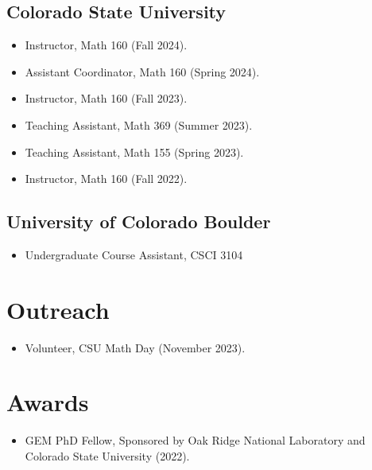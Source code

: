 \documentclass{cv_style}
\begin{document}
	\subsection{Colorado State University}
	\begin{itemize}
		\item Instructor, Math 160 (Fall 2024).
		\item Assistant Coordinator, Math 160 (Spring 2024).
		\item Instructor, Math 160 (Fall 2023).
		\item Teaching Assistant, Math 369 (Summer 2023).
		\item Teaching Assistant, Math 155 (Spring 2023).
		\item Instructor, Math 160 (Fall 2022).
	\end{itemize}
	\subsection{University of Colorado Boulder}
		\begin{itemize}
			\item Undergraduate Course Assistant, CSCI 3104
		\end{itemize}
		
	
	
		
	\section{Outreach}
		\begin{itemize}
			\item Volunteer, CSU Math Day (November 2023).
		\end{itemize}
		
	\section{Awards}
		\begin{itemize}
			\item GEM PhD Fellow, Sponsored by Oak Ridge National Laboratory and Colorado State University (2022).
		\end{itemize}
\end{document}
